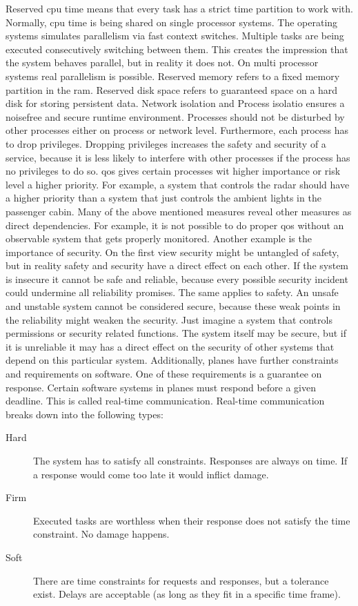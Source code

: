 \documentclass[titlepage]{report}
\begin{document}
Reserved \gls{cpu} time means that every task has a strict time partition to work with.
Normally, cpu time is being shared on single processor systems. The operating systems simulates
parallelism via fast context switches. Multiple tasks are being executed consecutively switching
between them. This creates the impression that the system behaves parallel, but in reality it does not.
On multi processor systems real parallelism is possible. Reserved memory refers to a fixed memory
partition in the \gls{ram}. Reserved disk space refers to guaranteed space on a hard disk for storing
persistent data. Network isolation and Process isolatio ensures a noisefree and secure runtime environment.
Processes should not be disturbed by other processes either on process or network level. Furthermore,
each process has to drop privileges. Dropping privileges increases the safety and security of a service,
because it is less likely to interfere with other processes if the process has no privileges to do so.
\gls{qos} gives certain processes wit higher importance or risk level a higher priority. For example,
a system that controls the radar should have a higher priority than a system that just controls
the ambient lights in the passenger cabin.
Many of the above mentioned measures reveal other measures as direct dependencies. For example,
it is not possible to do proper \gls{qos} without an observable system that gets properly monitored.
Another example is the importance of security. On the first view security might be untangled of safety,
but in reality safety and security have a direct effect on each other. If the system is insecure it cannot
be safe and reliable, because every possible security incident could undermine all reliability promises.
The same applies to safety. An unsafe and unstable system cannot be considered secure, because these
weak points in the reliability might weaken the security. Just imagine a system that controls
permissions or security related functions. The system itself may be secure, but if it is unreliable 
it may has a direct effect on the security of other systems that depend on this particular system.
Additionally, planes have further constraints and requirements on software. One of these requirements
is a guarantee on response. Certain software systems in planes must respond before a given deadline.
This is called real-time communication. Real-time communication breaks down into the following types\cite{worn2006echtzeitsysteme}:

\begin{description}
    \item[Hard] The system has to satisfy all constraints. Responses are always on time. If a response would come too late it would inflict damage.
    \item[Firm] Executed tasks are worthless when their response does not satisfy the time constraint. No damage happens.
    \item[Soft] There are time constraints for requests and responses, but a tolerance exist. Delays are acceptable (as long as they fit in a specific time frame).
\end{description}
\end{document}
